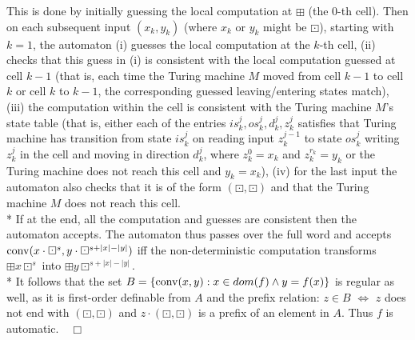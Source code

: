 \documentclass{LMCS}
\theoremstyle{plain}\newtheorem{athm}[thm]{Theorem}
\theoremstyle{plain}\newtheorem{aprop}[thm]{Proposition}
\theoremstyle{plain}\newtheorem{aprob}[thm]{Open Problem}
\theoremstyle{plain}\newtheorem{acor}[thm]{Corollary}
\theoremstyle{plain}\newtheorem{alem}[thm]{Lemma}
\theoremstyle{definition}\newtheorem{adefn}[thm]{Definition}
\theoremstyle{definition}\newtheorem{arem}[thm]{Remark}
\theoremstyle{plain}\newtheorem{aexmp}[thm]{Example}
\theoremstyle{plain}\newtheorem{aclm}[thm]{Claim}
\def\niceqed{~~$\Box$}
\def\conv{{\rm{conv}}}
\def\sp{\\*\indent}
\begin{document}
This is done by initially guessing the local computation at $\boxplus$
(the $0$-th cell).
Then on each subsequent input $(x_k,y_k)$ (where $x_k$ or $y_k$
might be $\boxdot$), starting with $k=1$,
the automaton (i) guesses the local computation at the $k$-th cell, 
(ii) checks that this guess in (i) is consistent with the local
computation guessed
at cell $k-1$ (that is, each time the Turing machine $M$ moved
from cell $k-1$ to cell $k$ or cell $k$ to $k-1$, the corresponding guessed
leaving/entering states match), (iii) the computation within the cell
is consistent with the
Turing machine $M$'s state table (that is, either each of the entries
$is_k^j,os_k^j,d_k^j,z_k^j$ satisfies that Turing machine has transition
from state $is_k^j$ on reading input $z_k^{j-1}$ to
state $os_k^j$ writing $z_k^j$ in the cell and moving in direction
$d_k^j$, where $z_k^0=x_k$ and $z_k^{r_k}=y_k$ or the Turing machine
does not reach this cell and $y_k = x_k$), (iv) 
for the last input the automaton also checks that it is of the form
$(\boxdot,\boxdot)$ and that the Turing machine $M$ does not reach
this cell.
\sp
If at the end, all the computation and guesses are consistent then the
automaton accepts.
The automaton thus passes over the full word and
accepts $\conv(x\cdot \boxdot^s,y\cdot \boxdot^{s+|x|-|y|})$ iff the 
non-deterministic computation transforms 
$\boxplus x \boxdot^s$ into 
$\boxplus y \boxdot^{s+|x|-|y|}$.
\sp
It follows that the set 
$B = \{\conv(x,y): x \in dom(f) \wedge y = f(x)\}$
is regular as well, as it is first-order definable from
$A$ and the prefix relation: $z \in B$ $\Leftrightarrow$
$z$ does not end with $(\boxdot,\boxdot)$ and
$z \cdot (\boxdot,\boxdot)$ is a prefix of an element in $A$.
Thus $f$ is automatic.\niceqed
\end{document}

